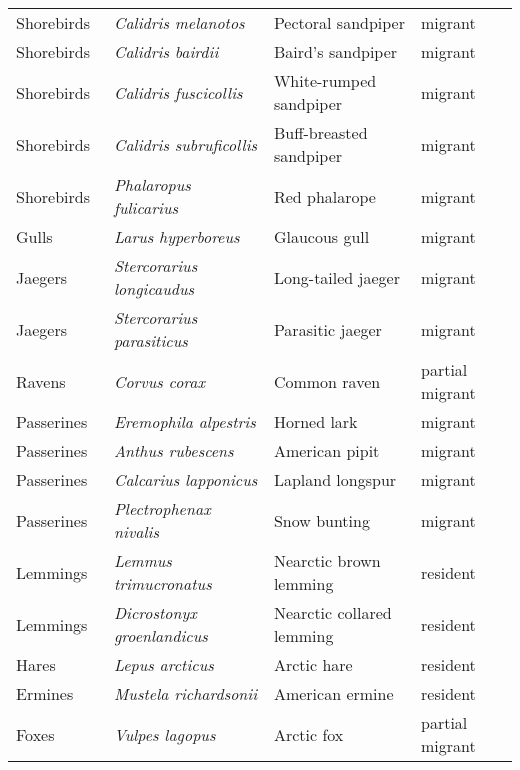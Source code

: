 \begin{table}[ht]
\begin{tabularx}{0.97\textwidth}{llll}
  Shorebirds  & {\emph{ Calidris melanotos}} & Pectoral sandpiper & migrant \\ 
  Shorebirds  & {\emph{ Calidris bairdii}} & Baird's sandpiper & migrant \\ 
  Shorebirds  & {\emph{ Calidris fuscicollis}} & White-rumped sandpiper & migrant \\ 
  Shorebirds  & {\emph{ Calidris subruficollis}} & Buff-breasted sandpiper & migrant \\ 
  Shorebirds  & {\emph{ Phalaropus fulicarius}} & Red phalarope & migrant \\ 
  Gulls  & {\emph{ Larus hyperboreus}} & Glaucous gull & migrant \\ 
  Jaegers  & {\emph{ Stercorarius longicaudus}} & Long-tailed jaeger & migrant \\ 
  Jaegers  & {\emph{ Stercorarius parasiticus}} & Parasitic jaeger & migrant \\ 
  Ravens  & {\emph{ Corvus corax}} & Common raven & partial migrant \\ 
  Passerines & {\emph{ Eremophila alpestris}} & Horned lark & migrant \\ 
  Passerines & {\emph{ Anthus rubescens}} & American pipit & migrant \\ 
  Passerines & {\emph{ Calcarius lapponicus}} & Lapland longspur & migrant \\ 
  Passerines & {\emph{ Plectrophenax nivalis}} & Snow bunting & migrant \\ 
  Lemmings  & {\emph{ Lemmus trimucronatus}} & Nearctic brown lemming & resident \\ 
  Lemmings  & {\emph{ Dicrostonyx groenlandicus}} & Nearctic collared lemming & resident \\ 
  Hares  & {\emph{ Lepus arcticus}} & Arctic hare & resident \\ 
  Ermines  & {\emph{ Mustela richardsonii}} & American ermine & resident \\ 
  Foxes  & {\emph{ Vulpes lagopus}} & Arctic fox & partial migrant \\ 
   \hline
\end{tabularx}
\endgroup
\end{table}

